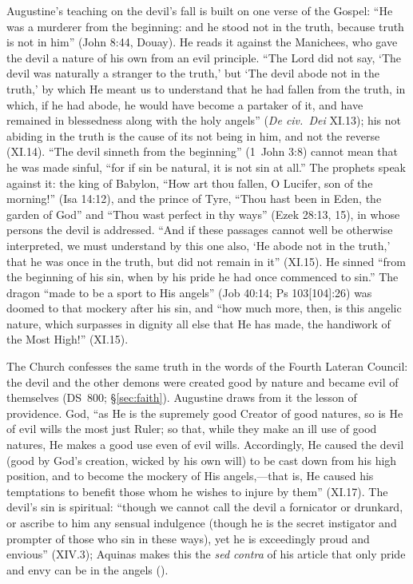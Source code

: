 Augustine's teaching on the devil's fall is built on one verse of the
Gospel: ``He was a murderer from the beginning: and he stood not in the
truth, because truth is not in him'' (John 8:44, Douay). He reads it
against the Manichees, who gave the devil a nature of his own from an
evil principle. ``The Lord did not say, `The devil was naturally a
stranger to the truth,' but `The devil abode not in the truth,' by which
He meant us to understand that he had fallen from the truth, in which, if
he had abode, he would have become a partaker of it, and have remained in
blessedness along with the holy angels'' (\emph{De civ.\ Dei} XI.13);
his not abiding in the truth is the cause of its not being in him, and not
the reverse (XI.14). ``The devil sinneth from the beginning'' (1~John 3:8) cannot
mean that he was made sinful, ``for if sin be natural, it is not sin at
all.'' The prophets speak against it: the king of Babylon, ``How art thou
fallen, O Lucifer, son of the morning!'' (Isa 14:12), and the prince of
Tyre, ``Thou hast been in Eden, the garden of God'' and ``Thou wast
perfect in thy ways'' (Ezek 28:13, 15), in whose persons the devil is
addressed. ``And if these passages cannot well be otherwise interpreted,
we must understand by this one also, `He abode not in the truth,' that he
was once in the truth, but did not remain in it'' (XI.15). He sinned
``from the beginning of his sin, when by his pride he had once commenced
to sin.'' The dragon ``made to be a sport to His angels'' (Job 40:14;
Ps 103[104]:26) was doomed to that mockery after his sin, and ``how much
more, then, is this angelic nature,
which surpasses in dignity all else that He has made, the handiwork of the
Most High!'' (XI.15).

The Church confesses the same truth in the words of the Fourth Lateran
Council: the devil and the other demons were created good by nature and
became evil of themselves (DS~800; \S\ref{sec:faith}). Augustine draws
from it the lesson of providence. God, ``as He is the supremely good
Creator of good natures, so is He of evil wills the most just Ruler; so
that, while they make an ill use of good natures, He makes a good use even
of evil wills. Accordingly, He caused the devil (good by God's creation,
wicked by his own will) to be cast down from his high position, and to
become the mockery of His angels,---that is, He caused his temptations to
benefit those whom he wishes to injure by them'' (XI.17). The devil's sin
is spiritual: ``though
we cannot call the devil a fornicator or drunkard, or ascribe to him any
sensual indulgence (though he is the secret instigator and prompter of
those who sin in these ways), yet he is exceedingly proud and envious''
(XIV.3); Aquinas makes this the \emph{sed contra} of his article that only
pride and envy can be in the angels ().


